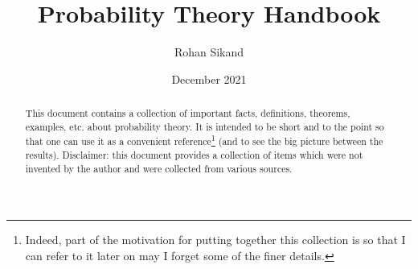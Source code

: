 \documentclass[11pt]{article}
\title{\textbf{Probability Theory Handbook}}
\author{Rohan Sikand}
\date{December 2021}
\theoremstyle{definition}
\begin{document}
\maketitle 
\begin{abstract}

This document contains a collection of important facts, definitions, theorems, examples, etc. about probability theory. It is intended to be short and to the point so that one can use it as a convenient reference\footnote{Indeed, part of the motivation for putting together this collection is so that I can refer to it later on may I forget some of the finer details.} (and to see the big picture between the results). Disclaimer: this document provides a collection of items which were not invented by the author and were collected from various sources. 
\end{abstract}
\tableofcontents
\newpage







\newpage
\printbibliography %
\end{document}
